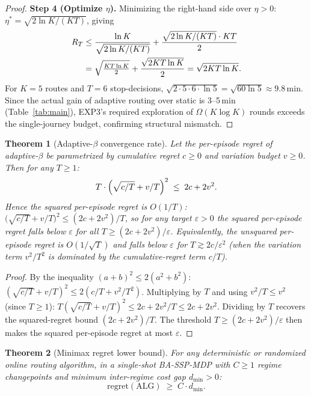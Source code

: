 \documentclass[11pt]{article}
\newtheorem{theorem}{Theorem}
\theoremstyle{definition}
\theoremstyle{remark}
\begin{document}
\begin{proof}
\noindent\textbf{Step 4 (Optimize $\eta$).}
Minimizing the right-hand side over $\eta > 0$:
$\eta^* = \sqrt{2\ln K/(KT)}$, giving
\begin{align}
R_T
&\leq \frac{\ln K}{\sqrt{2\ln K/(KT)}} + \frac{\sqrt{2\ln K/(KT)}\cdot KT}{2}
\notag\\
&= \sqrt{\tfrac{KT\ln K}{2}} + \frac{\sqrt{2KT\ln K}}{2}
= \sqrt{2KT\ln K}.
\label{eq:exp3_final}
\end{align}
For $K=5$ routes and $T=6$ stop-decisions,
$\sqrt{2\cdot 5\cdot 6\cdot\ln 5} = \sqrt{60\ln 5}\approx 9.8$\,min.
Since the actual gain of adaptive routing over static is 3--5\,min
(Table~\ref{tab:main}), EXP3's required exploration of $\Omega(K\log K)$ rounds
exceeds the single-journey budget, confirming structural mismatch.
\end{proof}

\begin{theorem}[Adaptive-$\beta$ convergence rate]\label{thm:converge}
Let the per-episode regret of adaptive-$\beta$ be parametrized by
cumulative regret $c \geq 0$ and variation budget $v \geq 0$.
Then for any $T \geq 1$:
\[
T\cdot\Bigl(\sqrt{c/T} + v/T\Bigr)^2 \;\leq\; 2c + 2v^2.
\]
Hence the squared per-episode regret is $O(1/T)$:
$\bigl(\sqrt{c/T} + v/T\bigr)^2 \leq (2c + 2v^2)/T$, so for any
target $\varepsilon > 0$ the squared per-episode regret falls below
$\varepsilon$ for all $T \geq (2c + 2v^2)/\varepsilon$. Equivalently,
the unsquared per-episode regret is $O(1/\sqrt{T})$ and falls below
$\varepsilon$ for $T \gtrsim 2c/\varepsilon^2$ (when the variation
term $v^2/T^2$ is dominated by the cumulative-regret term $c/T$).
\end{theorem}

\begin{proof}
By the inequality $(a+b)^2 \leq 2(a^2 + b^2)$:
$(\sqrt{c/T} + v/T)^2 \leq 2(c/T + v^2/T^2)$.
Multiplying by $T$ and using $v^2/T \leq v^2$ (since $T \geq 1$):
$T(\sqrt{c/T}+v/T)^2 \leq 2c + 2v^2/T \leq 2c + 2v^2$. Dividing
by $T$ recovers the squared-regret bound $(2c+2v^2)/T$. The
threshold $T \geq (2c+2v^2)/\varepsilon$ then makes the squared
per-episode regret at most $\varepsilon$.
\end{proof}

\begin{theorem}[Minimax regret lower bound]\label{thm:lower}
For any deterministic or randomized online routing algorithm,
in a single-shot BA-SSP-MDP with $C \geq 1$ regime changepoints
and minimum inter-regime cost gap $d_{\min} > 0$:
\[
\mathrm{regret}(\mathrm{ALG}) \;\geq\; C \cdot d_{\min}.
\]
\end{theorem}
\end{document}

